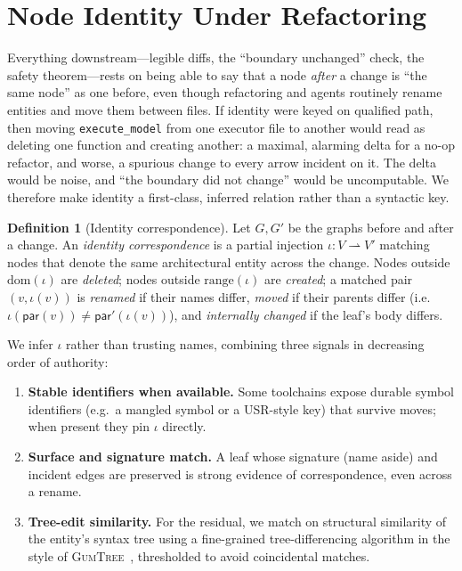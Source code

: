 \documentclass[sigconf,review,anonymous]{acmart}
\theoremstyle{plain}
\theoremstyle{definition}
\newtheorem{definition}[theorem]{Definition}
\begin{document}
\section{Node Identity Under Refactoring}\label{sec:identity}

Everything downstream---legible diffs, the ``boundary unchanged'' check, the
safety theorem---rests on being able to say that a node \emph{after} a change
is ``the same node'' as one before, even though refactoring and agents
routinely rename entities and move them between files. If identity were keyed on
qualified path, then moving \texttt{execute\_model} from one executor file to
another would read as deleting one function and creating another: a maximal,
alarming delta for a no-op refactor, and worse, a spurious change to every
arrow incident on it. The delta would be noise, and ``the boundary did not
change'' would be uncomputable. We therefore make identity a first-class,
inferred relation rather than a syntactic key.

\begin{definition}[Identity correspondence]\label{def:identity}
Let $G,G'$ be the graphs before and after a change. An \emph{identity
correspondence} is a partial injection $\iota : V \rightharpoonup V'$ matching
nodes that denote the same architectural entity across the change. Nodes
outside $\mathrm{dom}(\iota)$ are \emph{deleted}; nodes outside
$\mathrm{range}(\iota)$ are \emph{created}; a matched pair $(v,\iota(v))$ is
\emph{renamed} if their names differ, \emph{moved} if their parents differ
(i.e.\ $\iota(\mathsf{par}(v)) \neq \mathsf{par}'(\iota(v))$), and
\emph{internally changed} if the leaf's body differs.
\end{definition}

We infer $\iota$ rather than trusting names, combining three signals in
decreasing order of authority:

\begin{enumerate}[leftmargin=1.4em,itemsep=2pt,topsep=2pt]
\item \textbf{Stable identifiers when available.} Some toolchains expose
durable symbol identifiers (e.g.\ a mangled symbol or a USR-style key) that
survive moves; when present they pin $\iota$ directly.
\item \textbf{Surface and signature match.} A leaf whose signature (name aside)
and incident edges are preserved is strong evidence of correspondence, even
across a rename.
\item \textbf{Tree-edit similarity.} For the residual, we match on structural
similarity of the entity's syntax tree using a fine-grained tree-differencing
algorithm in the style of \textsc{GumTree}~\cite{falleri2014finegrained},
thresholded to avoid coincidental matches.
\end{enumerate}
\end{document}
